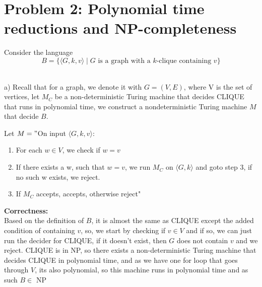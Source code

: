 \documentclass[a4paper,addpoints
	]{exam}
\begin{document}
\section*{Problem 2: Polynomial time reductions and NP-completeness}
\begin{questions}
    \question[20] Consider the language \[B=\{\langle G,k,v \rangle \mid G \text{ is a graph with a $k$-clique containing $v$}\}\] 
    
    \begin{solutionbox}{} \\ 

	    a) Recall that for a graph, we denote it with $G=(V,E)$,
	    where V is the set of vertices, let $M_C$ be a non-deterministic Turing machine that decides CLIQUE that runs in polynomial time, 
	    we construct a nondeterministic Turing machine $M$ that decide $B$.

    
	Let $M="$On input $\langle G,k,v \rangle$: 
	\begin{enumerate}
		\item For each $w\in V$, we check if $w=v$
		\item If there exists a w, such that $w=v$, we run $M_C$ on $\langle G, k\rangle$ and goto step 3, if no such w exists, we reject.
		\item If $M_C$ accepts, accepts, otherwise reject"
	\end{enumerate}

	\vspace{2em}

	\textbf{\large Correctness:}\\ 
	Based on the definition of $B$, it is almost the same as CLIQUE except the added condition of containing $v$, 
	so, we start by checking if $v \in V$ and if so, we can just run the decider for CLIQUE, if it doesn't exist, 
	then $G$ does not contain $v$ and we reject.
	CLIQUE is in NP, so there exists a non-deterministic Turing machine that decides CLIQUE in polynomial time, 
	and as we have one for loop that goes through $V$, its also polynomial, so this machine runs in polynomial time and as such $B \in$ NP 
    

\end{solutionbox}
\end{questions}
\end{document}
